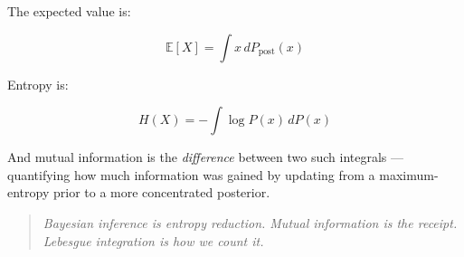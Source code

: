 The expected value is:

\[
\mathbb{E}[X] = \int x \, dP_{\text{post}}(x)
\]

Entropy is:

\[
H(X) = -\int \log P(x) \, dP(x)
\]

And mutual information is the \textit{difference} between two such integrals — quantifying how much information was gained by updating from a maximum-entropy prior to a more concentrated posterior.

\begin{quote}
\textit{Bayesian inference is entropy reduction. Mutual information is the receipt. Lebesgue integration is how we count it.}
\end{quote}



